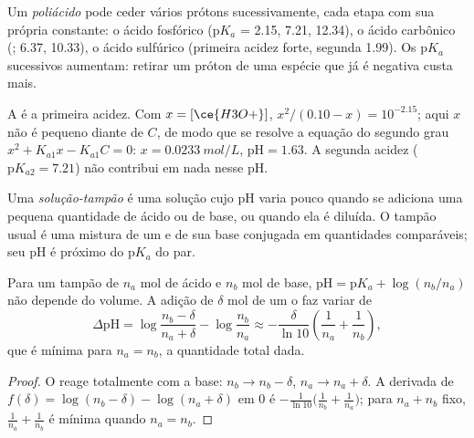 \begin{definition}[Poliácido]\label{def:b1:predominant-reaction:polyprotic}
Um \emph{poliácido} pode ceder vários prótons
sucessivamente, cada etapa com sua própria constante: o ácido fosfórico
 ($\mathrm{p}K_a$ = 2.15, 7.21, 12.34), o ácido carbônico
(; 6.37, 10.33), o ácido sulfúrico (primeira acidez forte,
segunda 1.99). Os $\mathrm{p}K_a$ sucessivos aumentam: retirar um próton
de uma espécie que já é negativa custa mais.
\end{definition}

\begin{example}\label{ex:b1:predominant-reaction:h3po4}
A  é a primeira acidez. Com $x = [\ce{H3O+}]$,
$x^2/(0.10 - x) = 10^{-2.15}$; aqui $x$ não é pequeno diante de $C$, de
modo que se resolve a equação do segundo grau $x^2 + K_{a1}x - K_{a1}C = 0$: $x =
\qty{0.0233}{mol/L}$, $\mathrm{pH} = 1.63$. A segunda acidez
($\mathrm{p}K_{a2} = 7.21$) não contribui em nada nesse pH.
\end{example}

\begin{definition}\label{def:b1:predominant-reaction:buffer}
Uma \emph{solução-tampão} é uma solução cujo pH
varia pouco quando se adiciona uma pequena quantidade de ácido ou de
base, ou quando ela é diluída. O tampão usual é uma mistura de um  e de sua base conjugada em quantidades comparáveis; seu pH é
próximo do $\mathrm{p}K_a$ do par.
\end{definition}

\begin{proposition}\label{prop:b1:predominant-reaction:buffer}
Para um tampão de $n_a$ mol de ácido e $n_b$ mol de base, $\mathrm{pH} =
\mathrm{p}K_a + \log(n_b/n_a)$ não depende do volume. A adição de
$\delta$ mol de um  o faz variar de
\[
  \Delta\mathrm{pH} = \log\frac{n_b - \delta}{n_a + \delta} - \log\frac{n_b}{n_a}
  \approx -\frac{\delta}{\ln 10}\left(\frac{1}{n_a} + \frac{1}{n_b}\right),
\]
que é mínima para $n_a = n_b$, a quantidade total dada.
\end{proposition}

\begin{proof}
O  reage totalmente com a base: $n_b \to n_b - \delta$,
$n_a \to n_a + \delta$. A derivada de $f(\delta) = \log(n_b - \delta) -
\log(n_a + \delta)$ em 0 é $-\frac{1}{\ln10}\big(\frac{1}{n_b} +
\frac{1}{n_a}\big)$; para $n_a + n_b$ fixo, $\frac1{n_a} + \frac1{n_b}$ é
mínima quando $n_a = n_b$.
\end{proof}

